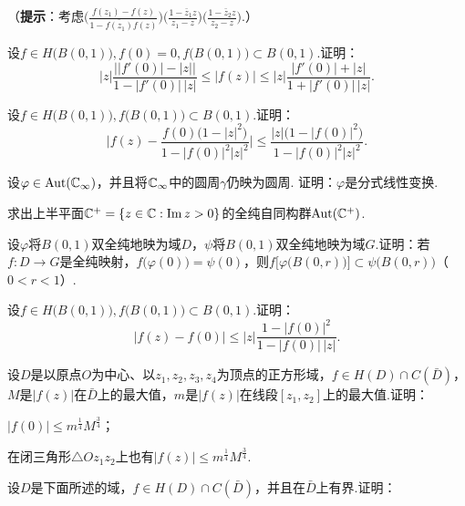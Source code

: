 \begin{xiti}
      （\textbf{提示}：考虑$\bigg(\frac{f(z_1)-f(z)}{1-\bar{f(z_1)}f(z)}\bigg)
       \bigg(\frac{1-\bar z_1z}{z_1-z}\bigg)\bigg(\frac{1-\bar z_2z}{z_2-z}\bigg)$.）
  \item 设$f\in H\big(B(0,1)\big),f(0)=0,f\big(B(0,1)\big)\subset B(0,1)$.证明：
      \[
        |z|\frac{\big||f'(0)|-|z|\big|}{1-|f'(0)|\,|z|}\le|f(z)|\le|z|
        \frac{|f'(0)|+|z|}{1+|f'(0)|\,|z|}.
      \]
  \item 设$f\in H\big(B(0,1)\big),f\big(B(0,1)\big)\subset B(0,1)$.证明：
      \[
        \bigg|f(z)-\frac{f(0)\big(1-|z|^2\big)}{1 -|f(0)|^2|z|^2}\bigg|
        \le\frac{|z|\big(1-|f(0)|^2\big)}{1-|f(0)|^2|z|^2}.
      \]
  \item 设$\varphi\in\operatorname{Aut}(\mathbb C_\infty)$，并且将$\mathbb C_\infty$中的圆周$\gamma$仍映为圆周. 证明：$\varphi$是分式线性变换.
  \item 求出上半平面$\mathbb C^+=\{z\in \mathbb C:\operatorname{Im} z>0\}$的全纯自同构群$\operatorname{Aut}(\mathbb C^+)$.
  \item 设$\varphi$将$B(0,1)$双全纯地映为域$D$，$\psi$将$B(0,1)$双全纯地映为域$G$.证明：若$f:D\to G$是全纯映射，$f\big(\varphi(0)\big)=\psi(0)$，则$f\big[\varphi\big(B(0,r)\big)\big]
      \subset \psi\big(B(0,r)\big)$（$0<r<1$）.
  \item 设$f\in H\big(B(0,1)\big),f\big(B(0,1)\big)\subset B(0,1)$.证明：
      \[
        |f(z)-f(0)|\le|z|\frac{1-|f(0)|^2}{1-|f(0)|\,|z|}.
      \]
  \item 设$D$是以原点$O$为中心、以$z_1,z_2,z_3,z_4$为顶点的正方形域，$f\in H(D)\cap C(\bar D)$，$M$是$|f(z)|$在$\bar D$上的最大值，$m$是$|f(z)|$在线段$[z_1,z_2]$上的最大值.证明：
    \begin{enuma}
      \item $|f(0)|\le m^{\frac14}M^{\frac34}$；
      \item 在闭三角形$\triangle Oz_1z_2$上也有$|f(z)|\le m^{\frac14}M^{\frac34}$.
    \end{enuma}
  \item 设$D$是下面所述的域，$f\in H(D)\cap C(\bar D)$，并且在$\bar D$上有界.证明：
\end{xiti}
